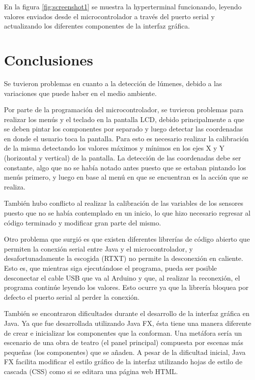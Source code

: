 \documentclass[conference]{IEEEtran}
\begin{document}
En la figura \ref{fig:screenshot1} se muestra la hyperterminal funcionando, leyendo valores enviados desde el microcontrolador a través del puerto serial y actualizando los diferentes componentes de la interfaz gráfica.

\section{Conclusiones}
Se tuvieron problemas en cuanto a la detección de lúmenes, debido a las variaciones que puede haber en el medio ambiente. 

Por parte de la programación del microcontrolador, se tuvieron problemas para realizar los menús y el teclado en la pantalla LCD, debido principalmente a que se deben pintar los componentes por separado y luego detectar las coordenadas en donde el usuario toca la pantalla. Para esto es necesario realizar la calibración de la misma detectando los valores máximos y mínimos en los ejes X y Y (horizontal y vertical) de la pantalla. La detección de las coordenadas debe ser constante, algo que no se había notado antes puesto que se estaban pintando los menús primero, y luego en base al menú en que se encuentran es la acción que se realiza.

También hubo conflicto al realizar la calibración de las variables de los sensores puesto que no se había contemplado en un inicio, lo que hizo necesario regresar al código terminado y modificar gran parte del mismo.

Otro problema que surgió es que existen diferentes librerías de código abierto que permiten la conexión serial entre Java y el microcontrolador, y desafortunadamente la escogida (RTXT) no permite la desconexión en caliente. Esto es, que mientras siga ejecutándose el programa, pueda ser posible desconectar el cable USB que va al Arduino y que, al realizar la reconexión, el programa continúe leyendo los valores. Esto ocurre ya que la librería bloquea por defecto el puerto serial al perder la conexión.

También se encontraron dificultades durante el desarrollo de la interfaz gráfica en Java. Ya que fue desarrollada utilizando Java FX, ésta tiene una manera diferente de crear e inicializar los componentes que la conforman. Una metáfora sería un escenario de una obra de teatro (el panel principal) compuesta por escenas más pequeñas (los componentes) que se añaden. A pesar de la dificultad inicial, Java FX facilita modificar el estilo gráfico de la interfaz utilizando hojas de estilo de cascada (CSS) como si se editara una página web HTML.
\end{document}
